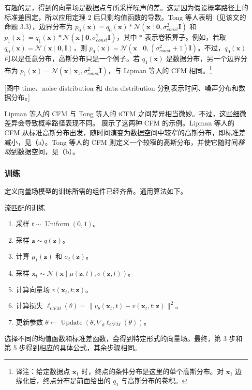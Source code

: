 \begin{itemize}
  有趣的是，得到的向量场是数据点与所采样噪声的差。这是因为假设概率路径上的标准差固定，所以应用定理 2 后只剩均值函数的导数。Tong 等人表明（见该文的命题 3.3），边界分布为 $p_0(\mathbf x)=q_0(\mathbf x)*\mathcal N(\mathbf x\mid\mathbf 0,\sigma_{\mathit{const}}^2\mathbf I)$ 和 $p_1(\mathbf x)=q_1(\mathbf x)*\mathcal N(\mathbf x\mid\mathbf 0,\sigma_{\mathit{const}}^2\mathbf I)$，其中 $*$ 表示卷积算子。例如，若取 $q_0(\mathbf x)=\mathcal N(\mathbf x\mid\mathbf 0,\mathbf I)$，则 $p_0(\mathbf x)=\mathcal N(\mathbf x\mid\mathbf 0,(\sigma_{\mathit{const}}^2+1)\mathbf I)$。不过，$q_0(\mathbf x)$ 可以是任意分布，高斯分布只是一个例子。若 $q_1(\mathbf x)$ 是数据分布，另一个边界分布为 $p_1(\mathbf x)=\mathcal N(\mathbf x\mid\mathbf x_1,\sigma_{\mathit{const}}^2\mathbf I)$，与 Lipman 等人的 CFM 相同。\footnote{译注：给定数据点 $\mathbf x_1$ 时，终点的条件分布是这里的单个高斯分布。对 $\mathbf x_1$ 边缘化后，终点分布是前面给出的 $q_1$ 与高斯分布的卷积。}
\end{itemize}

[图中 time、noise distribution 和 data distribution 分别表示时间、噪声分布和数据分布。]

Lipman 等人的 CFM 与 Tong 等人的 iCFM 之间差异相当微妙。不过，这些细微差异会导致概率路径表现不同。 展示了这两种 CFM 的示例。Lipman 等人的 CFM 从标准高斯分布出发，随时间演变为数据空间中较窄的高斯分布，即标准差减小，见（a）。Tong 等人的 CFM 则定义一个较窄的高斯分布，并使它随时间\emph{移动}到数据空间，见（b）。

\subsubsection{训练}

定义向量场模型的训练所需的组件已经齐备。通用算法如下。
\begin{booknote}[colframe=blue!65!black,colback=blue!4]{流匹配的训练}
  \begin{enumerate}
    \item 采样 $t\sim\operatorname{Uniform}(0,1)$。
    \item 采样 $\mathbf z\sim q(\mathbf z)$。
    \item 计算 $\mu_t(\mathbf z)$ 和 $\sigma_t(\mathbf z)$。
    \item 采样 $\mathbf x_t\sim\mathcal N(\mathbf x\mid\mu(\mathbf z,t),\sigma(\mathbf z,t))$。
    \item 计算向量场 $v(\mathbf x_t,t;\mathbf z)$。
    \item 计算损失 $\ell_{\mathit{CFM}}(\theta)=\lVert v_\theta(\mathbf x_t,t)-v(\mathbf x_t,t;\mathbf z)\rVert^2$。
    \item 更新参数 $\theta\gets\operatorname{Update}(\theta,\nabla_\theta\ell_{\mathit{CFM}}(\theta))$。
  \end{enumerate}
\end{booknote}
选择不同的均值函数和标准差函数，会得到特定形式的向量场。最终，第 3 步和第 5 步得到相应的具体公式，其余步骤相同。

